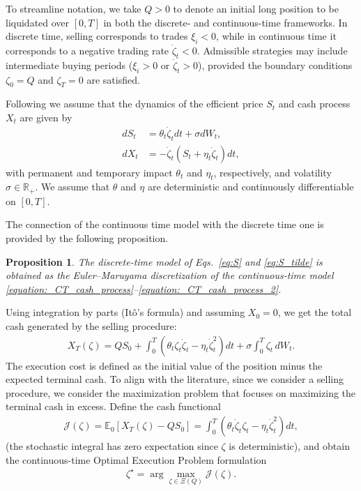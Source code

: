 \documentclass[final,3p,authoryear,12pt]{elsarticle}
\newtheorem{definition}{Definition}
\newtheorem{proposition}{Proposition}
\begin{document}
To streamline notation, we take \(Q>0\) to denote an initial long position to be
liquidated over \([0,T]\) in both the discrete- and continuous-time frameworks.
In discrete time, selling corresponds to trades \(\xi_i<0\), while in continuous
time it corresponds to a negative trading rate \(\dot\zeta_t<0\). Admissible
strategies may include intermediate buying periods (\(\xi_i>0\) or
\(\dot\zeta_t>0\)), provided the boundary conditions \(\zeta_0=Q\) and
\(\zeta_T=0\) are satisfied.



Following \cite{almgren2001optimal} we assume that the dynamics of the efficient price $S_t$ and cash process $X_t$ are given by
\begin{align}
        \label{equation:_CT_cash_process}
        dS_t &= \theta_t \dot \zeta_t dt+\sigma dW_t, \\
        \label{equation:_CT_cash_process_2}
        dX_t &= -\dot \zeta_t(S_t+\eta_t \dot \zeta_t)dt,
\end{align}
with permanent and temporary impact $\theta_t$ and $\eta_t$, respectively, and
volatility $\sigma \in \mathbb{R}_{+}$. We assume that $\theta$ and $\eta$ are
deterministic and continuously differentiable on $[0,T]$.

The connection of the continuous time model with the discrete time one is provided by the following proposition.

\begin{proposition}
\label{proposition:EMdiscretization}
The discrete-time model of Eqs.~\eqref{eq:S} and \eqref{eq:S_tilde} is obtained
as the Euler--Maruyama discretization of the continuous-time model
\eqref{equation:_CT_cash_process}--\eqref{equation:_CT_cash_process_2}.
\end{proposition}

Using integration by parts (It\^{o}'s formula) and assuming $X_0=0$, we get the
total cash generated by the selling procedure:
\begin{eqnarray}
    X_T(\zeta)
    =QS_0+\int_0^T(\theta_t \zeta_t \dot \zeta_t-\eta_t\dot \zeta_t^2)dt
    +\sigma\int_0^T \zeta_t\,dW_t.
\end{eqnarray}
The execution cost is defined as the initial value of the position minus the expected terminal cash. To align with the literature, since we consider a selling procedure, we consider the maximization problem that focuses on maximizing the terminal cash in excess. 
Define the cash functional 
\begin{eqnarray}
    \label{eq:cash}
    \mathcal{J}(\zeta)
    = \mathbb{E}_{0}\left[X_T(\zeta)-Q S_0\right]
    = \int_0^T \left(\theta_t \dot \zeta_t \zeta_t - \eta_t \dot \zeta_{t}^2\right) dt,
\end{eqnarray}
(the stochastic integral has zero expectation since $\zeta$ is deterministic), and obtain the continuous-time
Optimal Execution Problem formulation
\begin{eqnarray}
\label{problem:OTContinuousTime}
    \zeta^{\star} = \arg \max_{\zeta\in\Xi(Q)} \mathcal{J}(\zeta).
\end{eqnarray}
\end{document}
